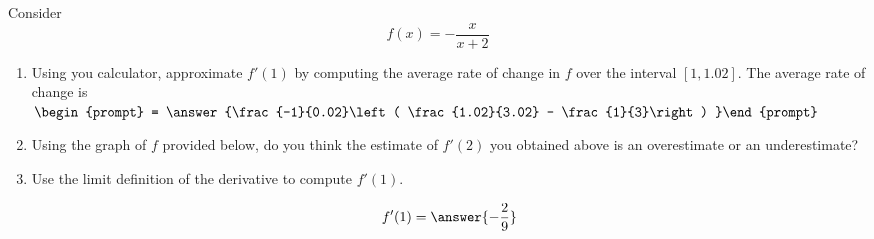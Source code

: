 \documentclass{ximera}
\author{Steven Gubkin}
\begin{document}
\begin{exercise}



Consider 
\[
f(x) = -\frac{x}{x+2}
\]



\begin{enumerate}
\item Using you calculator, approximate $f'(1)$ by computing the average rate of change in $f$ over the interval $[1,1.02]$.  The average rate of change is  $\begin{prompt} = \answer{\frac{-1}{0.02}\left( \frac{1.02}{3.02} - \frac{1}{3}\right) }\end{prompt}$
\item Using the graph of $f$ provided below, do you think the estimate of $f'(2)$ you obtained above is an overestimate or an underestimate?

\begin{prompt}
\begin{multipleChoice}
\end{multipleChoice}
\end{prompt}

\begin{image}
\end{image}

\item Use the limit definition of the derivative to compute $f'(1)$.  \begin{prompt} $$f'(1) = \answer{-\frac{2}{9}}$$\end{prompt}
\end{enumerate}
\end{exercise}
\end{document}
